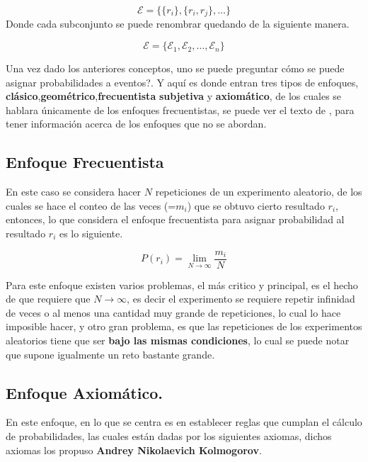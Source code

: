 \begin{equation*}
    \mathcal{E} = \{\{r_i\},\{r_i,r_j\},\dots\}
\end{equation*}
Donde cada subconjunto se puede renombrar quedando de la siguiente manera.

\begin{equation*}
    \mathcal{E} = \{\mathcal{E}_1,\mathcal{E}_2,\dots,\mathcal{E}_n\}
\end{equation*}

Una vez dado los anteriores conceptos, uno se puede preguntar cómo se puede asignar probabilidades a eventos?. Y aquí es donde entran tres tipos de enfoques, \textbf{clásico},\textbf{geométrico},\textbf{frecuentista} \textbf{subjetiva} y  \textbf{axiomático}, de los cuales se hablara únicamente de los enfoques frecuentistas, se puede ver el texto de \cite{RinconIntro}, para tener información acerca de los enfoques que no se abordan.

\subsection{Enfoque Frecuentista}

En este caso se considera hacer $N$ repeticiones de un experimento aleatorio, de los cuales se hace el conteo de las veces (=$m_i$) que se obtuvo cierto resultado $r_i$, entonces, lo que considera el enfoque frecuentista para asignar probabilidad al resultado $r_i$ es lo siguiente.

\begin{equation*}
    P(r_i) = \lim_{N\to \infty}\frac{m_i}{N}
\end{equation*}

Para este enfoque existen varios problemas, el más critico y principal, es el hecho de que requiere que $N\to \infty$, es decir el experimento se requiere repetir infinidad de veces o al menos una cantidad muy grande de repeticiones, lo cual lo hace imposible hacer, y otro gran problema, es que las repeticiones de los experimentos aleatorios tiene que ser \textbf{bajo las mismas condiciones}, lo cual se puede notar que supone igualmente un reto bastante grande.

\subsection{Enfoque Axiomático.}

En este enfoque, en lo que se centra es en establecer reglas que cumplan el cálculo de probabilidades, las cuales están dadas por los siguientes axiomas, dichos axiomas los propuso \textbf{Andrey Nikolaevich Kolmogorov}.




